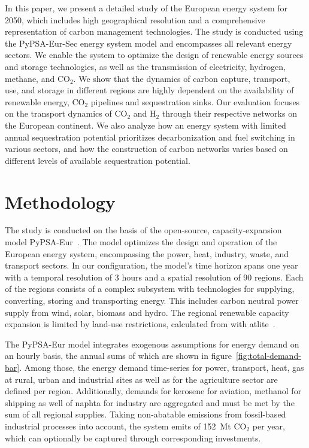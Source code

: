 \documentclass[twocolumn]{article}
\newcommand{\carbon}{CO$_2$}
\newcommand{\hydrogen}{H$_2$}
\begin{document}
In this paper, we present a detailed study of the European energy system for 2050, which includes high geographical resolution and a comprehensive representation of carbon management technologies. The study is conducted using the PyPSA-Eur-Sec energy system model and encompasses all relevant energy sectors. We enable the system to optimize the design of renewable energy sources and storage technologies, as well as the transmission of electricity, hydrogen, methane, and \carbon{}. We show that the dynamics of carbon capture, transport, use, and storage in different regions are highly dependent on the availability of renewable energy, \carbon{} pipelines and sequestration sinks. Our evaluation focuses on the transport dynamics of \carbon{} and \hydrogen{} through their respective networks on the European continent. We also analyze how an energy system with limited annual sequestration potential prioritizes decarbonization and fuel switching in various sectors, and how the construction of carbon networks varies based on different levels of available sequestration potential.


\section{Methodology}
\label{sec:methodology}

The study is conducted on the basis of the open-source, capacity-expansion model PyPSA-Eur~\cite{horschPyPSAEurOpenOptimisation2018,brownSynergiesSectorCoupling2018,PyPSAEurSecSectorCoupledOpen2023}. The model optimizes the design and operation of the European energy system, encompassing the power, heat, industry, waste, and transport sectors. In our configuration, the model's time horizon spans one year with a temporal resolution of 3 hours and a spatial resolution of 90 regions. Each of the regions consists of a complex subsystem with technologies for supplying, converting, storing and transporting energy. This includes carbon neutral power supply from wind, solar, biomass and hydro. The regional renewable capacity expansion is limited by land-use restrictions, calculated from with atlite~\cite{hofmannAtliteLightweightPython2021}.




%
The PyPSA-Eur model integrates exogenous assumptions for energy demand on an hourly basis, the annual sums of which are shown in figure~\ref{fig:total-demand-bar}. Among those, the energy demand time-series for power, transport, heat, gas at rural, urban and industrial sites as well as for the agriculture sector are defined per region. Additionally, demands for kerosene for aviation, methanol for shipping as well of naphta for industry are aggregated and must be met by the sum of all regional supplies.
Taking non-abatable emissions from fossil-based industrial processes into account, the system emits of 152~Mt \carbon{} per year, which can optionally be captured through corresponding investments.
\end{document}
